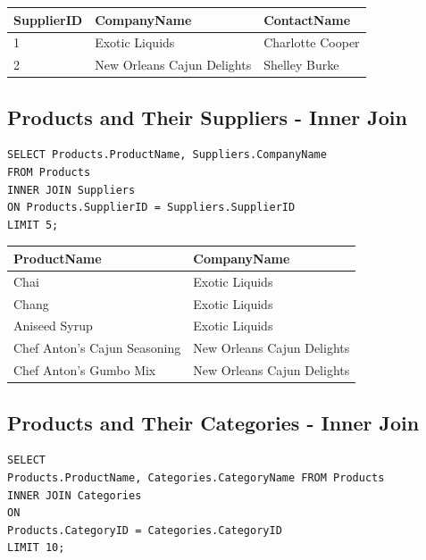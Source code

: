 \documentclass[10pt]{article}
\begin{document}
\begin{table}[H]
\begin{tabular}{|l|l|l|}
\hline
SupplierID	& CompanyName	& ContactName \\
\hline
1	& Exotic Liquids	& Charlotte Cooper \\
2	& New Orleans Cajun Delights	& Shelley Burke \\
\hline
\end{tabular}
\end{table}


\subsection{Products and Their Suppliers - Inner Join}
\begin{verbatim}
SELECT Products.ProductName, Suppliers.CompanyName
FROM Products
INNER JOIN Suppliers
ON Products.SupplierID = Suppliers.SupplierID
LIMIT 5;
\end{verbatim}

\begin{table}[H]
\begin{tabular}{|l|l|}
\hline
ProductName	& CompanyName \\
\hline
Chai	& Exotic Liquids \\
Chang	& Exotic Liquids \\
Aniseed Syrup	& Exotic Liquids \\
Chef Anton's Cajun Seasoning	& New Orleans Cajun Delights \\
Chef Anton's Gumbo Mix	& New Orleans Cajun Delights \\
\hline
\end{tabular}
\end{table}


\subsection{Products and Their Categories - Inner Join}
\begin{verbatim}
SELECT 
Products.ProductName, Categories.CategoryName FROM Products  
INNER JOIN Categories
ON 
Products.CategoryID = Categories.CategoryID
LIMIT 10;
\end{verbatim}
\end{document}
